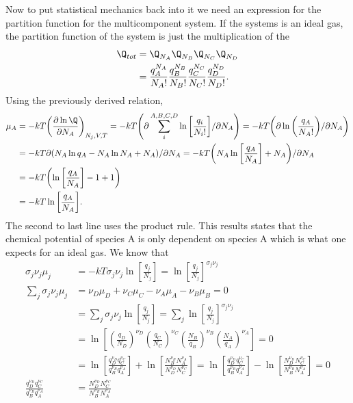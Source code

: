 Now to put statistical mechanics back into it we need an expression for the
partition function for the multicomponent system.  If the systems is an ideal
gas, the partition function of the system is just the multiplication of the
\begin{align*}
	\Q_{tot} &= \Q_{N_{A}} \Q_{N_B} \Q_{N_C} \Q_{N_{D}}\\
			&= \frac{q_{A}^{N_A}}{N_A !} \frac{q_{B}^{N_B}}{N_B !}
			   \frac{q_{C}^{N_C}}{N_C !} \frac{q_{D}^{N_D}}{N_D !}.
\end{align*}
Using the previously derived relation,
\begin{align*}
	\mu_A &= -kT {\left(\frac{\partial \ln{\Q}}{\partial N_{A}}\right)}_{N_j, V,
	T}
			= -kT {\left(\partial \sum_{i}^{A, B, C, D}
					{\ln{\left[\frac{q_{i}}{N_{i}!}\right]}} / \partial N_A
			\right)}
			= -kT {\left(\partial \ln{\left(\frac{q_{A}}{N_{A}!}\right)} /
			 \partial N_A \right)}\\
		  &= -kT \partial(N_{A} \ln{q_{A}} - N_{A}\ln{N_{A}} + N_{A}) / \partial N_A
		  = -kT {\left( N_A \ln{\left[\frac{q_A}{N_{A}}\right]} + N_A \right)} /
		  \partial N_A \\
		  &= -kT {\left( \ln{\left[ \frac{q_A}{N_A} \right]} - 1 + 1 \right)}\\
		  &= -kT \ln{\left[ \frac{q_A}{N_A} \right]}.
\end{align*}
The second to last line uses the product rule. This results states that the
chemical potential of species A is only dependent on species A which is what one
expects for an ideal gas. We know that
\begin{align*}
	\sigma_j \nu_j \mu_j &= -kT \sigma_j \nu_j \ln{\left[ \frac{q_j}{N_j}
	\right]} = \ln{\left[ \frac{q_j}{N_j} \right]}^{\sigma_j \nu_{j}}\\  
	\sum_{j}{\sigma_j \nu_j \mu_j} &= \nu_D \mu_D + \nu_C \mu_C - \nu_A \mu_A -
	\nu_B \mu_B =0 \\
		&= \sum_{j}{\sigma_j \nu_j \ln{\left[ \frac{q_j}{N_j} \right]}}
		= \sum_{j}{\ln{\left[ \frac{q_j}{N_j} \right]}^{\sigma_j \nu_{j}}}\\
		&= \ln{\left[ {\left(\frac{q_D}{N_{D}}\right)}^{\nu_D}
		{\left(\frac{q_C}{N_{C}}\right)}^{\nu_C}
		{\left(\frac{N_B}{q_{B}}\right)}^{\nu_B}
		{\left(\frac{N_A}{q_{A}}\right)}^{\nu_A} \right]} = 0\\
		&= \ln{\left[
			\frac{q_{D}^{\nu_D}q_{C}^{\nu_C}}{q_{B}^{\nu_B}q_{A}^{\nu_A}}
			\right]} +
			\ln{\left[
			\frac{N_{B}^{\nu_B}N_{A}^{\nu_A}}{N_{D}^{\nu_D}N_{C}^{\nu_C}}
			\right]} = 
			\ln{\left[
			\frac{q_{D}^{\nu_D}q_{C}^{\nu_C}}{q_{B}^{\nu_B}q_{A}^{\nu_A}}
			\right]} -
			\ln{\left[
			\frac{N_{D}^{\nu_D}N_{C}^{\nu_C}}{N_{B}^{\nu_B}N_{A}^{\nu_A}}
			\right]} = 0 \\
	\frac{q_{D}^{\nu_D}q_{C}^{\nu_C}}{q_{B}^{\nu_B}q_{A}^{\nu_A}} &= 
		\frac{N_{D}^{\nu_D}N_{C}^{\nu_C}}{N_{B}^{\nu_B}N_{A}^{\nu_A}} 
\end{align*}
